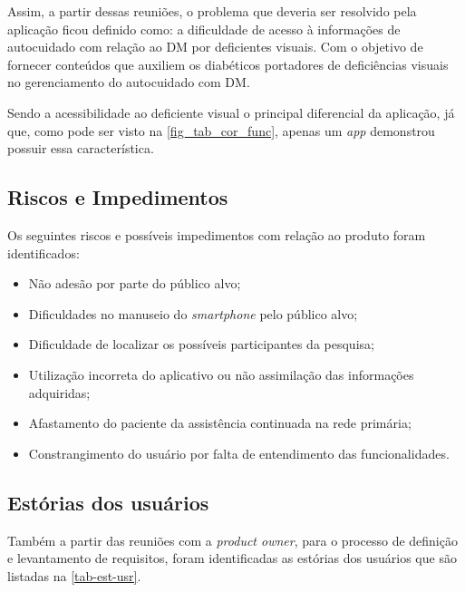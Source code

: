 Assim, a partir dessas reuniões, o problema que deveria ser resolvido pela aplicação ficou
definido como: a dificuldade de acesso à informações de autocuidado com relação ao DM por deficientes visuais.
Com o objetivo de fornecer conteúdos que auxiliem os diabéticos portadores de deficiências visuais no gerenciamento
do autocuidado com DM\@.

Sendo a acessibilidade ao deficiente visual o principal diferencial da aplicação, já que, como pode ser visto na \autoref{fig_tab_cor_func},
apenas um \emph{app} demonstrou possuir essa característica.

\subsection{Riscos e Impedimentos}

Os seguintes riscos e possíveis impedimentos com relação ao produto foram identificados:

\begin{itemize}
    \item Não adesão por parte do público alvo;
    \item Dificuldades no manuseio do \emph{smartphone} pelo público alvo;
    \item Dificuldade de localizar os possíveis participantes da pesquisa;
    \item Utilização incorreta do aplicativo ou não assimilação das informações adquiridas;
    \item Afastamento do paciente da assistência continuada na rede primária;
    \item Constrangimento do usuário por falta de entendimento das funcionalidades.
\end{itemize}

\newpage

\subsection{Estórias dos usuários}

Também a partir das reuniões com a \emph{product owner}, para o processo de definição e levantamento de requisitos, foram identificadas
as estórias dos usuários que são listadas na \autoref{tab-est-usr}.

